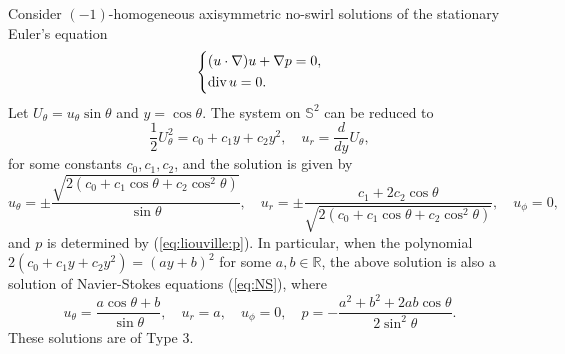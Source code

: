 \documentclass[12pt]{article}
\newcommand{\dive}{{\rm div \hspace{0.05cm} }}
\newcommand{\bS}{\mathbb{S}}
\begin{document}
Consider $(-1)$-homogeneous axisymmetric no-swirl solutions of the stationary Euler's equation 
\[
\left\{
	\begin{aligned}
	& ( u \cdot \nabla ) u + \nabla p = 0, \\ 
	& \dive u=0.
	\end{aligned}
\right.
\]
Let $U_{\theta}= u_{\theta}\sin\theta$ and $y=\cos\theta$. The system on $\bS^2$ can be reduced to 
\begin{equation}
	\frac{1}{2}U^2_{\theta}=c_0+c_1y+c_2y^2, \quad u_r= \frac{d}{dy}U_{\theta},
\end{equation}
for some constants $c_0, c_1, c_2$, and the solution is given by 
\[
	u_{\theta}=\pm \frac{\sqrt{2(c_0 + c_1 \cos\theta + c_2 \cos^2\theta)}}{\sin\theta}, \quad u_r=\pm \frac{c_1+2c_2\cos\theta}{\sqrt{2(c_0 + c_1 \cos\theta + c_2 \cos^2\theta)}}, \quad u_{\phi}=0, 
\]
and $p$ is determined by (\ref{eq:liouville:p}). In particular, when the polynomial $2(c_0 + c_1 y + c_2 y^2)=(ay+b)^2$ for some $a, b\in\mathbb{R}$, the above solution is also a solution of Navier-Stokes equations (\ref{eq:NS}), where 
\[
	u_{\theta}=\frac{a\cos\theta+b}{\sin\theta}, \quad u_r=a, \quad u_{\phi}=0, \quad p=-\frac{a^2+b^2+2ab\cos\theta}{2\sin^2\theta}. 
\]
These solutions are of Type 3. 
\end{document}
